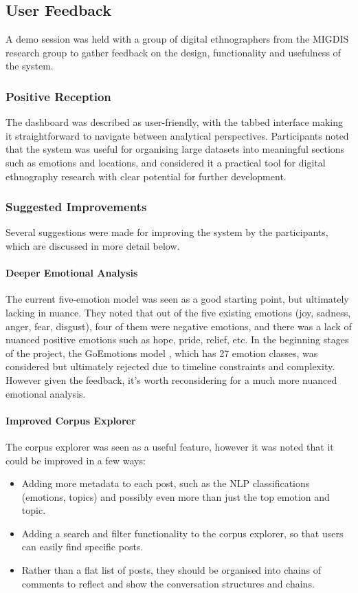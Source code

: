 \documentclass[12pt, a4paper]{article}
\begin{document}
\subsection{User Feedback}
A demo session was held with a group of digital ethnographers from the  MIGDIS research group to gather feedback on the  design, functionality and usefulness of the system.

\subsubsection{Positive Reception}
The dashboard was described as user-friendly, with the tabbed interface making it straightforward to navigate between analytical perspectives. Participants noted that the system was useful for organising large datasets into meaningful sections such as emotions and locations, and considered it a practical tool for digital ethnography research with clear potential for further development.

\subsubsection{Suggested Improvements}
Several suggestions were made for improving the system by the participants, which are discussed in more detail below.

\paragraph{Deeper Emotional Analysis}
The current five-emotion model was seen as a good starting point, but ultimately lacking in nuance. They noted that out of the five existing emotions (joy, sadness, anger, fear, disgust), four of them were negative emotions, and there was a lack of nuanced positive emotions such as hope, pride, relief, etc. In the beginning stages of the project, the GoEmotions model \cite{demszky2020goemotions}, which has 27 emotion classes, was considered but ultimately rejected due to timeline constraints and complexity. However given the feedback, it's worth reconsidering for a much more nuanced emotional analysis.

\paragraph{Improved Corpus Explorer}
The corpus explorer was seen as a useful feature, however it was noted that it could be improved in a few ways:
\begin{itemize}
    \item Adding more metadata to each post, such as the NLP classifications (emotions, topics) and possibly even more than just the top emotion and topic.
    \item Adding a search and filter functionality to the corpus explorer, so that users can easily find specific posts.
    \item Rather than a flat list of posts, they should be organised into chains of comments to reflect and show the conversation structures and chains.
\end{itemize}
\end{document}
